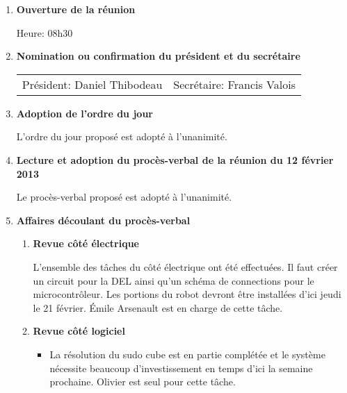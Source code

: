 \documentclass[12pt]{ULojpv}
\begin{document}
\entete
\begin{enumerate}
\item \textbf{Ouverture de la réunion}

Heure: 08h30


\item \textbf{Nomination ou confirmation du président et du secrétaire}

\begin{tabular}{@{}ll}
   Président: Daniel Thibodeau
   & Secrétaire: Francis Valois
\end{tabular}


\item \textbf{Adoption de l'ordre du jour}

L'ordre du jour proposé est adopté à l'unanimité.


\item \textbf{Lecture et adoption du procès-verbal de la réunion du 12 février 2013}

Le procès-verbal proposé est adopté à l'unanimité.


\item \textbf{Affaires découlant du procès-verbal}

\begin{enumerate}

\item \textbf{Revue côté électrique}

L'ensemble des tâches du côté électrique ont été effectuées. Il faut créer un circuit pour la DEL ainsi qu'un schéma de connections pour le microcontrôleur. Les portions du robot devront être installées d'ici jeudi le 21 février. Émile Arsenault est en charge de cette tâche.

\item \textbf{Revue côté logiciel}
\begin{itemize}

\item La résolution du sudo cube est en partie complétée et le système nécessite beaucoup d'investissement en temps d'ici la semaine prochaine. Olivier est seul pour cette tâche.


\end{itemize}
\end{enumerate}
\end{enumerate}
\end{document}

